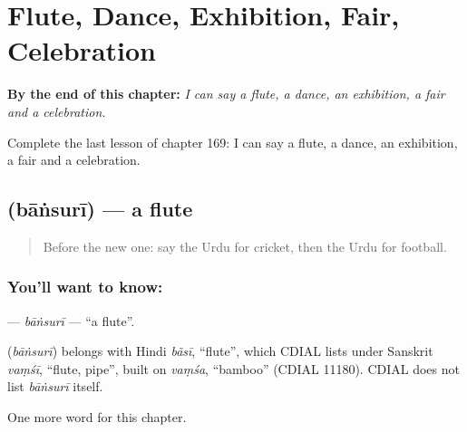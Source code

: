 
\chapter{Flute, Dance, Exhibition, Fair, Celebration}
\label{ch:ur-flute-dance-exhibition-fair-celebration}

\begin{chapteropening}
\textbf{By the end of this chapter:} \emph{I can say a flute, a dance, an exhibition, a fair and a celebration.}

Complete the last lesson of chapter 169: I can say a flute, a dance, an exhibition, a fair and a celebration.
\end{chapteropening}

\section[\texorpdfstring{\ur{بانسری} (bāṅsurī)}{بانسری (bāṅsurī)}]{ (bāṅsurī) — a flute}

\label{lesson:UR-C169-bansuri}



\begin{quote}
Before the new one: say the Urdu for cricket, then the Urdu for football.
\end{quote}

\subsection*{You'll want to know: }
\textbf{} — \emph{bāṅsurī} — \textquotedblleft{}a flute\textquotedblright{}.

\begin{cousinweb}
\textbf{} (\emph{bāṅsurī}) belongs with Hindi \emph{bãsī}, \textquotedblleft{}flute\textquotedblright{}, which CDIAL lists under Sanskrit \emph{vaṃśī}, \textquotedblleft{}flute, pipe\textquotedblright{}, built on \emph{vaṃśa}, \textquotedblleft{}bamboo\textquotedblright{} (CDIAL 11180). CDIAL does not list \emph{bāṅsurī} itself.
\end{cousinweb}

\begin{grammarlens}[title={What you've built}]
One more word for this chapter.
\end{grammarlens}

